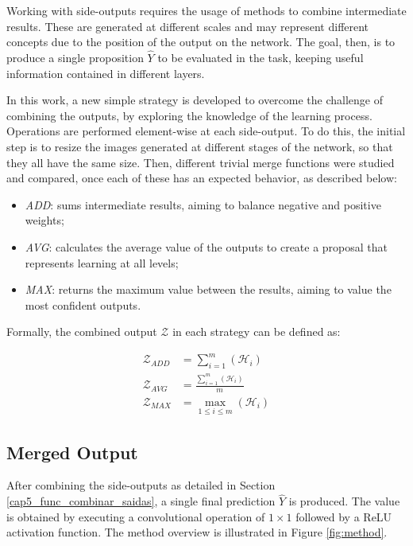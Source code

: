Working with side-outputs requires the usage of methods to combine intermediate results.
These are generated at different scales and may represent different concepts due to the position of the output on the network.
The goal, then, is to produce a single proposition $\hat{Y}$ to be evaluated in the task, keeping useful information contained in different layers.

In this work, a new simple strategy is developed to overcome the challenge of combining the outputs, by exploring the knowledge of the learning process.
Operations are performed element-wise at each side-output.
To do this, the initial step is to resize the images generated at different stages of the network, so that they all have the same size.
Then, different trivial merge functions were studied and compared, once each of these has an expected behavior, as described below:

\begin{itemize}
  \item \textit{ADD}: sums intermediate results, aiming to balance negative and positive weights;
  \item \textit{AVG}: calculates the average value of the outputs to create a proposal that represents learning at all levels;
  \item \textit{MAX}: returns the maximum value between the results, aiming to value the most confident outputs.
\end{itemize}

Formally, the combined output $\mathcal{Z}$ in each strategy can be defined as:

\begin{align}
  \mathcal{Z}_{ADD} &= \sum_{i=1}^{m}(\mathcal{H}_i)\\
  \mathcal{Z}_{AVG} &= \frac{\sum_{i=1}^{m}(\mathcal{H}_i)}{m}\\
  \mathcal{Z}_{MAX} &= \max_{1 \leq i \leq m} (\mathcal{H}_i)
\end{align} 

\subsection{Merged Output}
\label{cap5_saida_final_rede}

After combining the side-outputs as detailed in Section \ref{cap5_func_combinar_saidas}, a single final prediction $\hat{Y}$ is produced.
The value is obtained by executing a convolutional operation of $1 \times 1$ followed by a ReLU activation function.
The method overview is illustrated in Figure \ref{fig:method}.

